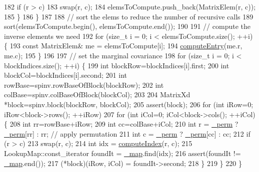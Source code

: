 \begin{DoxyCode}
182         \textcolor{keywordflow}{if} (r > c)
183           swap(r, c);
184         elemsToCompute.push\_back(MatrixElem(r, c));
185       \}
186   \}
187 
188   \textcolor{comment}{// sort the elems to reduce the number of recursive calls}
189   sort(elemsToCompute.begin(), elemsToCompute.end());
190 
191   \textcolor{comment}{// compute the inverse elements we need}
192   \textcolor{keywordflow}{for} (\textcolor{keywordtype}{size\_t} i = 0; i < elemsToCompute.size(); ++i) \{
193     \textcolor{keyword}{const} MatrixElem& me = elemsToCompute[i];
194     \hyperlink{classg2o_1_1MarginalCovarianceCholesky_a556f8da80f0873b74b57c82b587b4f97}{computeEntry}(me.r, me.c);
195   \}
196 
197   \textcolor{comment}{// set the marginal covariance }
198   \textcolor{keywordflow}{for} (\textcolor{keywordtype}{size\_t} i = 0; i < blockIndices.size(); ++i) \{
199     \textcolor{keywordtype}{int} blockRow=blockIndices[i].first;    
200     \textcolor{keywordtype}{int} blockCol=blockIndices[i].second;
201     \textcolor{keywordtype}{int} rowBase=spinv.rowBaseOfBlock(blockRow);
202     \textcolor{keywordtype}{int} colBase=spinv.colBaseOfBlock(blockCol);
203     
204     MatrixXd *block=spinv.block(blockRow, blockCol);
205     assert(block);
206     \textcolor{keywordflow}{for} (\textcolor{keywordtype}{int} iRow=0; iRow<block->rows(); ++iRow)
207       \textcolor{keywordflow}{for} (\textcolor{keywordtype}{int} iCol=0; iCol<block->cols(); ++iCol)\{
208   \textcolor{keywordtype}{int} rr=rowBase+iRow;
209   \textcolor{keywordtype}{int} cc=colBase+iCol;
210         \textcolor{keywordtype}{int} r = \hyperlink{classg2o_1_1MarginalCovarianceCholesky_a404f5d0ce82c2877324bafb8997b96aa}{\_perm} ? \hyperlink{classg2o_1_1MarginalCovarianceCholesky_a404f5d0ce82c2877324bafb8997b96aa}{\_perm}[rr] : rr; \textcolor{comment}{// apply permutation}
211         \textcolor{keywordtype}{int} c = \hyperlink{classg2o_1_1MarginalCovarianceCholesky_a404f5d0ce82c2877324bafb8997b96aa}{\_perm} ? \hyperlink{classg2o_1_1MarginalCovarianceCholesky_a404f5d0ce82c2877324bafb8997b96aa}{\_perm}[cc] : cc;
212         \textcolor{keywordflow}{if} (r > c)
213           swap(r, c);
214         \textcolor{keywordtype}{int} idx = \hyperlink{classg2o_1_1MarginalCovarianceCholesky_a51578d6676018d54d74dfe8ce70a9d4b}{computeIndex}(r, c);
215         LookupMap::const\_iterator foundIt = \hyperlink{classg2o_1_1MarginalCovarianceCholesky_a7a9d21e9ee6654b9e6d69a62e87c201a}{\_map}.find(idx);
216         assert(foundIt != \hyperlink{classg2o_1_1MarginalCovarianceCholesky_a7a9d21e9ee6654b9e6d69a62e87c201a}{\_map}.end());
217   (*block)(iRow, iCol) = foundIt->second;
218       \}
219   \}
220 \}
\end{DoxyCode}
